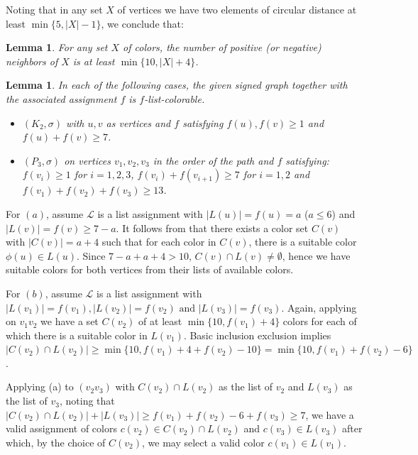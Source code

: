\documentclass[11pt,a4paper]{article}
\makeatletter
\renewenvironment{proof}[1][\proofname]{\par
	\pushQED{\qed}%
	\normalfont \topsep6\p@\@plus6\p@\relax
	\trivlist
	\item[\hskip\labelsep
	\bfseries
	#1\@addpunct{.}]\ignorespaces
}{%
	\popQED\endtrivlist\@endpefalse
}
\newtheorem{lemma}[theorem]{Lemma}
\theoremstyle{definition}
\makeatother
\begin{document}
	Noting that in any set $X$ of vertices we have  two elements of circular distance at least $\min\{5, |X|-1\}$, we conclude that:
	
	\begin{lemma}\label{lem:a+4} For any set  $X$ of colors, the number of positive (or negative) neighbors of $X$ is at least $\min \{10, |X|+4\}$.
	\end{lemma}
	
	
	
	\begin{lemma}\label{lem:K2P3Coloring}    
		In each of the following cases, the given signed graph together with the associated assignment $f$ is $f$-list-colorable.
		\begin{itemize}	
			\item[(a)] $(K_2, \sigma)$ with $u,v$  as vertices and $f$ satisfying $f(u), f(v)\geq 1$ and $f(u)+f(v)\geq 7$.
			
			\item[(b)] $(P_3, \sigma)$ on vertices $v_1,v_2,v_3$ in the order of the path and $f$ satisfying: $f(v_i)\geq 1$ for $i=1,2,3$, $f(v_i)+f(v_{i+1})\geq 7$ for $i=1,2$ and $f(v_1)+f(v_2)+f(v_3)\geq 13$.  
		\end{itemize}
	\end{lemma}
	
	
	\begin{proof}		
		For $(a)$, assume $\mathcal{L}$ is a list assignment with $|L(u)|=f(u)=a$ ($a\leq 6$) and $|L(v)|=f(v)\ge 7-a$. It follows from  that there exists a color set $C(v)$ with $|C(v)|=a+4$ such that for each color in $C(v)$, there is a suitable color $\phi(u)\in L(u)$. Since $7-a+a+4>10$, $C(v)\cap L(v)\neq \emptyset$, hence we have suitable colors for both vertices from their lists of available colors.
		
		
		For $(b)$, assume $\mathcal{L}$ is a list assignment with $|L(v_1)|=f(v_1), |L(v_2)|=f(v_2) \text{ and } |L(v_3)|=f(v_3).$ Again, applying  on $v_1v_2$ we have a set $C(v_2)$ of at least $\min\{10, f(v_1)+4\}$ colors for each of which there is a suitable color in $L(v_1)$. Basic inclusion exclusion implies $|C(v_2)\cap L(v_2)|\ge \min\{10, f(v_1)+4+f(v_2)-10\}=\min\{10, f(v_1)+f(v_2)-6\}$. 
		
		Applying (a) to $(v_2v_3)$ with $C(v_2)\cap L(v_2)$ as the list of $v_2$ and $L(v_3)$ as the list of $v_3$, noting that $|C(v_2)\cap L(v_2)|+|L(v_3)|\geq f(v_1)+f(v_2)-6+f(v_3)\geq 7$, we have a valid assignment of colors $c(v_2)\in C(v_2)\cap L(v_2)$ and $c(v_3)\in L(v_3)$ after which, by the choice of $C(v_2)$, we may select a valid color $c(v_1)\in L(v_1)$. 
	\end{proof}	
	
\end{document}
